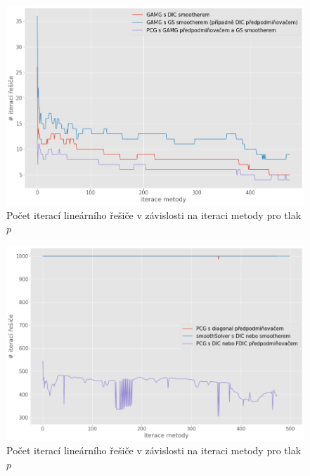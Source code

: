 \documentclass[a4paper,12pt]{report}
\theoremstyle{remark}
\begin{document}
\begin{figure}[H]
	\centering
	\includegraphics[width=1\linewidth]{p-solver-iters-1.png}
	\caption{Počet iterací lineárního řešiče v závislosti na iteraci metody pro tlak $p$}
	\label{fig:p-iters-1}
\end{figure}

\begin{figure}[H]
	\centering
	\includegraphics[width=1\linewidth]{p-solver-iters-2.png}
	\caption{Počet iterací lineárního řešiče v závislosti na iteraci metody pro tlak $p$}
	\label{fig:p-iters-2}
\end{figure}
\end{document}
